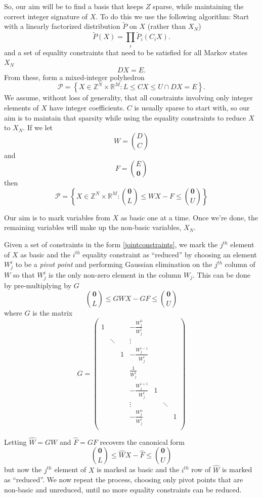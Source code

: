 \documentclass{article}
\begin{document}
So, our aim will be to find a basis that keeps $Z$ sparse, while maintaining the correct integer signature of $X$. To do this we use the following algorithm: Start with a linearly factorized distribution $\tilde{P}$ on $X$ (rather than $X_N$)
\[
\tilde{P}(X) = \prod_i \tilde{P}_i(C_iX).
\]
and a set of equality constraints that need to be satisfied for all Markov states $X_N$
\[
DX = E.
\]
From these, form a mixed-integer polyhedron
\[
\mathcal{P} = \left\{X \in \mathbb{Z}^N \times \mathbb{R}^M: L \le CX \le U \cap DX = E \right\}.
\]
We assume, without loss of generality, that all constraints involving only integer elements of $X$ have integer coefficients. $C$ is usually sparse to start with, so our aim is to maintain that sparsity while using the equality constraints to reduce $X$ to $X_N$. If we let
\[
W= {D \choose C}
\]
and
\[
F = {E \choose \mathbf{0}}
\]
then
\begin{equation}
\mathcal{P} = \left\{X \in \mathbb{Z}^N \times \mathbb{R}^M: {\mathbf{0} \choose L} \le W X - F \le {\mathbf{0} \choose U} \right\}
\label{jointconstraints}
\end{equation}

Our aim is to mark variables from $X$ as basic one at a time. Once we're done, the remaining variables will make up the non-basic variables, $X_N$.

Given a set of constraints in the form \eqref{jointconstraints}, we mark the $j^{th}$ element of $X$ as basic and the $i^{th}$ equality constraint as ``reduced'' by choosing an element $W^i_j$ to be a \textit{pivot point} and performing Gaussian elimination on the $j^{th}$ column of $W$ so that $W^i_j$ is the only non-zero element in the column $W_j$. This can be done by pre-multiplying by $G$
\[
{\mathbf{0} \choose L} \le GWX - GF \le {\mathbf{0} \choose U}
\]
where $G$ is the matrix
\[
G =  
\begin{pmatrix}
1 &  & &-\frac{W^0_j}{W^i_j} & & &\\
& \ddots & &\vdots & & &\\
& & 1 & -\frac{W^{i-1}_j}{W^i_j} & & &\\
& & & \frac{1}{W^i_j} & & &\\
& &  & -\frac{W^{i+1}_j}{W^i_j} & 1 & &\\
& & & \vdots & & \ddots &\\
& & & -\frac{W^n_j}{W^i_j} & & &1\\
\end{pmatrix}
\]

Letting $\hat{W} = GW$ and $\hat{F} = GF$ recovers the canonical form
\begin{equation}
{\mathbf{0} \choose L} \le \hat{W}X - \hat{F} \le {\mathbf{0} \choose U}
\label{eliminatedConstraint}
\end{equation}
but now the $j^{th}$ element of $X$ is marked as basic and the $i^{th}$ row of $\hat{W}$ is marked as ``reduced''. We now repeat the process, choosing only pivot points that are non-basic and unreduced, until no more equality constraints can be reduced.
\end{document}
